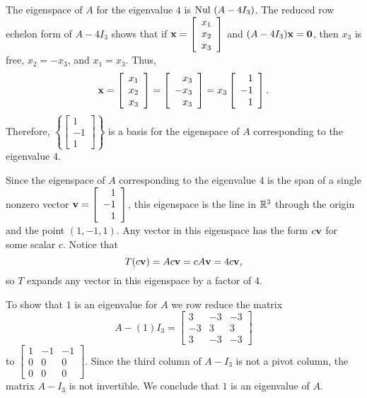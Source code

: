 \begin{example}
The eigenspace of $A$ for the eigenvalue $4$ is $\text{Nul } (A-4I_3)$. The reduced row echelon form of $A-4I_3$ shows that if $\mathbf{x} = \left[ \begin{array}{c} x_1\\x_2\\x_3 \end{array} \right]$ and $(A-4I_3) \mathbf{x} = \mathbf{0}$, then $x_3$ is free, $x_2 = -x_3$, and $x_1 = x_3$. Thus, 
\[\mathbf{x} = \left[ \begin{array}{c} x_1\\x_2\\x_3 \end{array} \right] = \left[  \begin{array}{r} x_3\\ -x_3\\x_3 \end{array} \right] = x_3 \left[ \begin{array}{r} 1\\-1\\1 \end{array} \right].\]
Therefore, $\left\{\left[ \begin{array}{r} 1\\-1\\1 \end{array} \right]\right\}$ is a basis for the eigenspace of $A$ corresponding to the eigenvalue $4$. 

\item Since the eigenspace of $A$ corresponding to the eigenvalue $4$ is the span of a single nonzero vector $\mathbf{v} = \left[ \begin{array}{r} 1\\-1\\1 \end{array} \right]$, this eigenspace is the line in $\mathbb{R}^3$ through the origin and the point $(1,-1,1)$. Any vector in this eigenspace has the form $c \mathbf{v}$ for some scalar $c$. Notice that 
\[T(c\mathbf{v}) = Ac\mathbf{v} = cA\mathbf{v} = 4c\mathbf{v},\]
so $T$ expands any vector in this eigenspace by a factor of 4. 


\item To show that $1$ is an eigenvalue for $A$ we row reduce the matrix 
\[A - (1)I_3 = \left[ \begin{array}{crr} 3&-3&-3\\-3&3&3\\3&-3&-3 \end{array} \right]\]
 to $\left[  \begin{array}{crr} 1&-1&-1\\0&0&0\\0&0&0\end{array} \right]$. Since the third column of $A -I_3$ is not a pivot column, the matrix $A -I_3$ is not invertible. We conclude that $1$ is an eigenvalue of $A$. 


\end{example}
